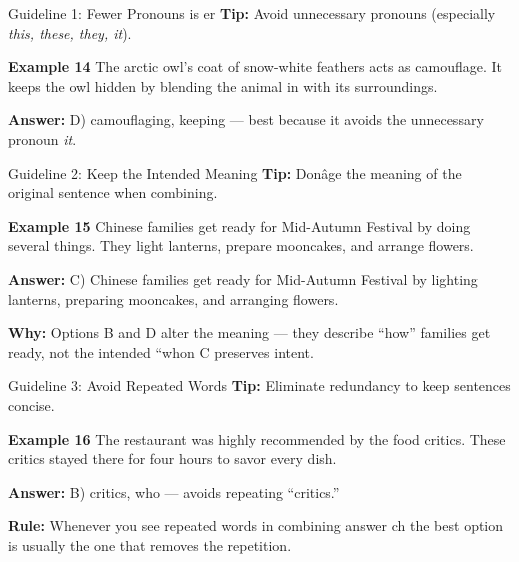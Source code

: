 \documentclass[aspectratio=169,11pt]{beamer}
\begin{document}
\begin{frame}{Guideline 1: Fewer Pronouns is er}
\small
\textbf{Tip:} Avoid unnecessary pronouns (especially \emph{this, these, they, it}).  

\vspace{0.5em}
\textbf{Example 14}  
The arctic owl’s coat of snow-white feathers acts as camouflage. It keeps the owl hidden by blending the animal in with its surroundings.  

\textbf{Answer:}  
D) camouflaging, keeping — best because it avoids the unnecessary pronoun \emph{it}.
\end{frame}

\begin{frame}{Guideline 2: Keep the Intended Meaning}
\small
\textbf{Tip:} Donâge the meaning of the original sentence when combining.  

\vspace{0.5em}
\textbf{Example 15}  
Chinese families get ready for Mid-Autumn Festival by doing several things. They light lanterns, prepare mooncakes, and arrange flowers.  

\textbf{Answer:}  
C) Chinese families get ready for Mid-Autumn Festival by lighting lanterns, preparing mooncakes, and arranging flowers.  

\vspace{0.5em}
\textbf{Why:} Options B and D alter the meaning — they describe “how” families get ready, not the intended “whon C preserves intent.
\end{frame}

\begin{frame}{Guideline 3: Avoid Repeated Words}
\small
\textbf{Tip:} Eliminate redundancy to keep sentences concise.  

\vspace{0.5em}
\textbf{Example 16}  
The restaurant was highly recommended by the food critics. These critics stayed there for four hours to savor every dish.  

\textbf{Answer:}  
B) critics, who — avoids repeating “critics.”  

\vspace{0.5em}
\textbf{Rule:} Whenever you see repeated words in combining answer ch the best option is usually the one that removes the repetition.
\end{frame}
\end{document}

